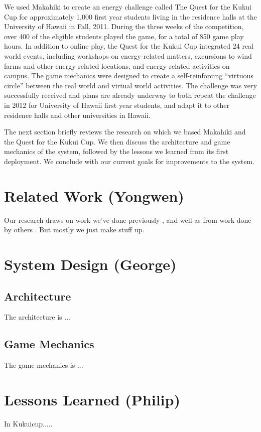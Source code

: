 \documentclass{acm_proc_article-sp}
\begin{document}
We used Makahiki to create an energy challenge called The Quest for the
Kukui Cup for approximately 1,000 first year students living in the
residence halls at the University of Hawaii in Fall, 2011.  During the
three weeks of the competition, over 400 of the eligible students played
the game, for a total of 850 game play hours.  In addition to online play,
the Quest for the Kukui Cup integrated 24 real world events, including
workshops on energy-related matters, excursions to wind farms and other
energy related locations, and energy-related activities on campus. The game
mechanics were designed to create a self-reinforcing ``virtuous circle''
between the real world and virtual world activities.  The challenge was
very successfully received and plans are already underway to both repeat
the challenge in 2012 for University of Hawaii first year students, and 
adapt it to other residence halls and other universities in Hawaii.

The next section briefly reviews the research on which we based Makahiki
and the Quest for the Kukui Cup.   We then discuss the architecture and
game mechanics of the system, followed by the lessons we learned from its
first deployment. We conclude with our current goals for improvements to
the system.

\section{Related Work (Yongwen)}
Our research draws on work we've done previously
\cite{csdl2-10-05,csdl2-10-07,csdl2-11-02,csdl2-11-03}, and well as from
work done by others \cite{Lazzaro2010}.  But mostly we just make stuff up.

\section{System Design (George)}

\subsection{Architecture}
The architecture is ...

\subsection{Game Mechanics}
The game mechanics is ...

\section{Lessons Learned (Philip)}
In Kukuicup.....
\end{document}

